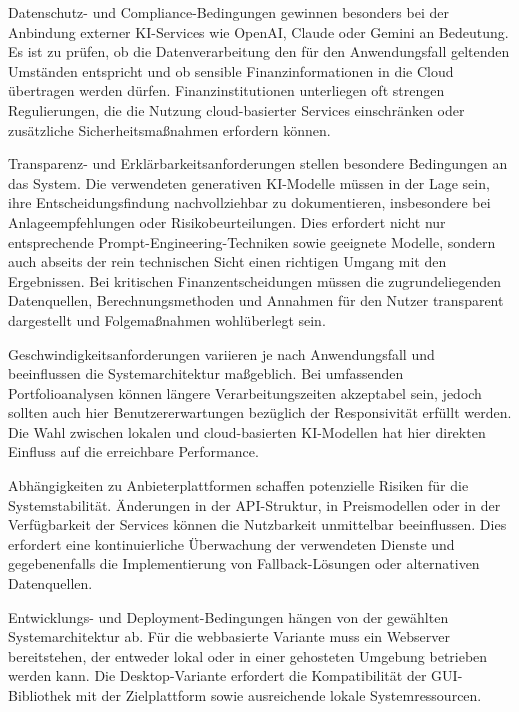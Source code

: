     Datenschutz- und Compliance-Bedingungen gewinnen besonders bei der Anbindung externer \acs{KI}-Services wie OpenAI, Claude oder Gemini an Bedeutung.
    Es ist zu prüfen, ob die Datenverarbeitung den für den Anwendungsfall geltenden Umständen entspricht und ob sensible Finanzinformationen in die Cloud übertragen werden dürfen.
    Finanzinstitutionen unterliegen oft strengen Regulierungen, die die Nutzung cloud-basierter Services einschränken oder zusätzliche Sicherheitsmaßnahmen erfordern können.

    Transparenz- und Erklärbarkeitsanforderungen stellen besondere Bedingungen an das System.
    Die verwendeten generativen \acs{KI}-Modelle müssen in der Lage sein, ihre Entscheidungsfindung nachvollziehbar zu dokumentieren, insbesondere bei Anlageempfehlungen oder Risikobeurteilungen.
    Dies erfordert nicht nur entsprechende Prompt-Engineering-Techniken sowie geeignete Modelle, sondern auch abseits der rein technischen Sicht einen richtigen Umgang mit den Ergebnissen.
    Bei kritischen Finanzentscheidungen müssen die zugrundeliegenden Datenquellen, Berechnungsmethoden und Annahmen für den Nutzer transparent dargestellt und Folgemaßnahmen wohlüberlegt sein.

    Geschwindigkeitsanforderungen variieren je nach Anwendungsfall und beeinflussen die Systemarchitektur maßgeblich.
    Bei umfassenden Portfolioanalysen können längere Verarbeitungszeiten akzeptabel sein, jedoch sollten auch hier Benutzererwartungen bezüglich der Responsivität erfüllt werden.
    Die Wahl zwischen lokalen und cloud-basierten \acs{KI}-Modellen hat hier direkten Einfluss auf die erreichbare Performance.

    Abhängigkeiten zu Anbieterplattformen schaffen potenzielle Risiken für die Systemstabilität.
    Änderungen in der \acs{API}-Struktur, in Preismodellen oder in der Verfügbarkeit der Services können die Nutzbarkeit unmittelbar beeinflussen.
    Dies erfordert eine kontinuierliche Überwachung der verwendeten Dienste und gegebenenfalls die Implementierung von Fallback-Lösungen oder alternativen Datenquellen.

    Entwicklungs- und Deployment-Bedingungen hängen von der gewählten Systemarchitektur ab.
    Für die webbasierte Variante muss ein Webserver bereitstehen, der entweder lokal oder in einer gehosteten Umgebung betrieben werden kann.
    Die Desktop-Variante erfordert die Kompatibilität der \acs{GUI}-Bibliothek mit der Zielplattform sowie ausreichende lokale Systemressourcen.

